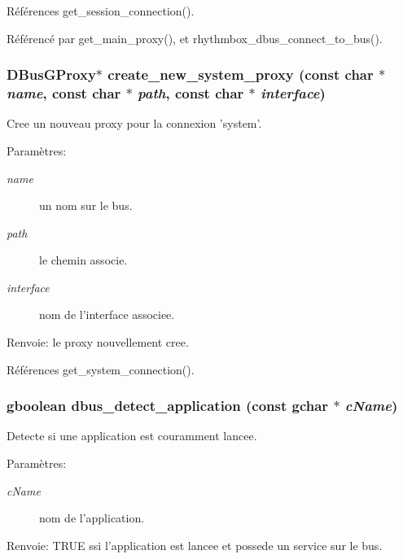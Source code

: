 Références get\_\-session\_\-connection().

Référencé par get\_\-main\_\-proxy(), et rhythmbox\_\-dbus\_\-connect\_\-to\_\-bus().
\subsubsection{\setlength{\rightskip}{0pt plus 5cm}DBusGProxy$\ast$ create\_\-new\_\-system\_\-proxy (const char $\ast$ {\em name}, \/  const char $\ast$ {\em path}, \/  const char $\ast$ {\em interface})}\label{cid-dbus_8c_c173b624ca07b24abe909dd19d4b740b}


Cree un nouveau proxy pour la connexion 'system'. \begin{Desc}
\item[Paramètres:]
\begin{description}
\item[{\em name}]un nom sur le bus. \item[{\em path}]le chemin associe. \item[{\em interface}]nom de l'interface associee. \end{description}
\end{Desc}
\begin{Desc}
\item[Renvoie:]le proxy nouvellement cree. \end{Desc}


Références get\_\-system\_\-connection().
\subsubsection{\setlength{\rightskip}{0pt plus 5cm}gboolean dbus\_\-detect\_\-application (const gchar $\ast$ {\em cName})}\label{cid-dbus_8c_a067a9c5c52e97de30de114afa353f22}


Detecte si une application est couramment lancee. \begin{Desc}
\item[Paramètres:]
\begin{description}
\item[{\em cName}]nom de l'application. \end{description}
\end{Desc}
\begin{Desc}
\item[Renvoie:]TRUE ssi l'application est lancee et possede un service sur le bus. \end{Desc}


